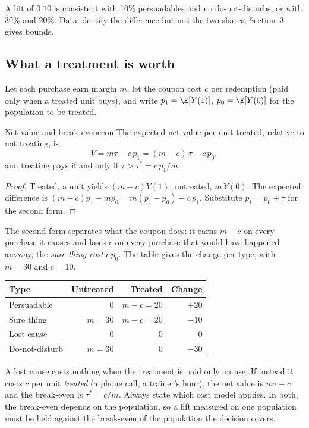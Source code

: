 \documentclass[11pt]{article}
\begin{document}
A lift of $0.10$ is consistent with 10\% persuadables and no do-not-disturbs, or with 30\% and 20\%. Data
identify the difference but not the two shares; Section~3 gives bounds.

\subsection{What a treatment is worth}

Let each purchase earn margin $m$, let the coupon cost $c$ per redemption (paid only when a treated unit
buys), and write $p_1 = \E[Y(1)]$, $p_0 = \E[Y(0)]$ for the population to be treated.

\begin{prop}{Net value and break-even}{econ}
The expected net value per unit treated, relative to not treating, is
\[
  V = m\tau - c\,p_1 = (m-c)\,\tau - c\,p_0,
\]
and treating pays if and only if $\tau > \tau^\ast = c\,p_1/m$.
\end{prop}
\begin{proof}
Treated, a unit yields $(m-c)Y(1)$; untreated, $m\,Y(0)$. The expected difference is
$(m-c)p_1 - m p_0 = m(p_1 - p_0) - c\,p_1$. Substitute $p_1 = p_0 + \tau$ for the second form.
\end{proof}

The second form separates what the coupon does: it earns $m-c$ on every purchase it causes and loses $c$
on every purchase that would have happened anyway, the \emph{sure-thing cost} $c\,p_0$. The table gives the
change per type, with $m = 30$ and $c = 10$.
\begin{center}
\begin{tabular}{lrrr}
\toprule
Type & Untreated & Treated & Change \\
\midrule
Persuadable & 0 & $m-c = 20$ & $+20$ \\
Sure thing & $m = 30$ & $m-c = 20$ & $-10$ \\
Lost cause & 0 & 0 & $0$ \\
Do-not-disturb & $m = 30$ & 0 & $-30$ \\
\bottomrule
\end{tabular}
\end{center}
A lost cause costs nothing when the treatment is paid only on use. If instead it costs $c$ per unit
\emph{treated} (a phone call, a trainer's hour), the net value is $m\tau - c$ and the break-even is
$\tau^\ast = c/m$. Always state which cost model applies. In both, the break-even depends on the
population, so a lift measured on one population must be held against the break-even of the population
the decision covers.
\end{document}
